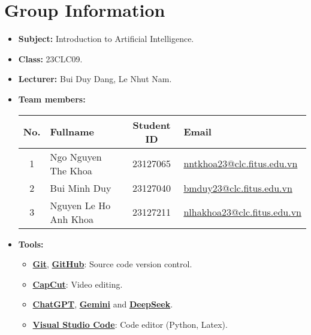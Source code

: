 \section{Group Information}
\begin{itemize}
  \item \textbf{Subject:} Introduction to Artificial Intelligence.
  \item \textbf{Class:} 23CLC09.
  \item \textbf{Lecturer:} Bui Duy Dang, Le Nhut Nam.
  \item \textbf{Team members:}
        \begin{center}
          \renewcommand{\arraystretch}{1.5}
          \begin{tabular}{|c|l|c|l|}
            \hline
            \textbf{No.} & \textbf{Fullname}     & \textbf{Student ID} & \textbf{Email}                                                         \\\hline
            1            & Ngo Nguyen The Khoa   & 23127065            & \href{mailto:nntkhoa23@clc.fitus.edu.vn}{nntkhoa23@clc.fitus.edu.vn}   \\\hline
            2            & Bui Minh Duy          & 23127040            & \href{mailto:bmduy23@clc.fitus.edu.vn}{bmduy23@clc.fitus.edu.vn}       \\\hline
            3            & Nguyen Le Ho Anh Khoa & 23127211            & \href{mailto:nlhakhoa23@clc.fitus.edu.vn}{nlhakhoa23@clc.fitus.edu.vn} \\\hline
          \end{tabular}
        \end{center}
  \item \textbf{Tools:}
        \begin{itemize}
          \item \href{https://git-scm.com/}{\textbf{Git}}, \href{https://github.com/}{\textbf{GitHub}}: Source code version control.
          \item \href{https://www.capcut.com/}{\textbf{CapCut}}: Video editing.
          \item \href{https://chatgpt.com/}{\textbf{ChatGPT}}, \href{https://gemini.google.com/}{\textbf{Gemini}} and \href{https://chat.deepseek.com/}{\textbf{DeepSeek}}.
          \item \href{https://code.visualstudio.com/}{\textbf{Visual Studio Code}}: Code editor (Python, Latex).
        \end{itemize}
\end{itemize}
